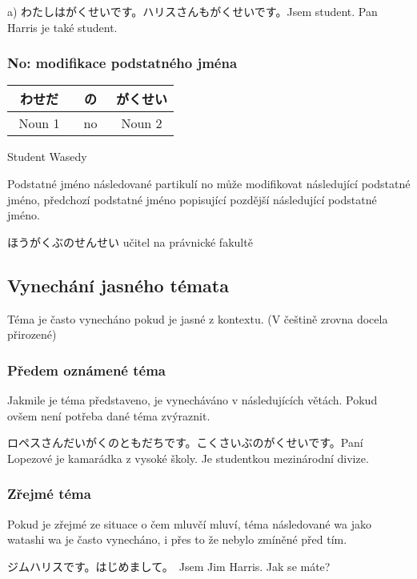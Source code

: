 a) わたしはがくせいです。ハリスさんもがくせいです。Jsem student. Pan Harris je také student.


\subsubsection{No: modifikace podstatného jména}
\begin{center}
\begin{tabular}{||c|c||c||}
\hline
わせだ　&の　&がくせい\\
\hline
Noun 1&no&Noun 2\\
\hline
\end{tabular}
\end{center}
Student Wasedy

Podstatné jméno následované partikulí no může modifikovat následující podstatné jméno, předchozí podstatné jméno popisující pozdější následující podstatné jméno. 


ほうがくぶのせんせい učitel na právnické fakultě

\subsection{Vynechání jasného témata}
Téma je často vynecháno pokud je jasné z kontextu. (V češtině zrovna docela přirozené)

\subsubsection{Předem oznámené téma}
Jakmile je téma představeno, je vynecháváno v následujících větách. Pokud ovšem není potřeba dané téma zvýraznit.

ロペスさんだいがくのともだちです。こくさいぶのがくせいです。Paní Lopezové je kamarádka z vysoké školy. Je studentkou mezinárodní divize.

\subsubsection{Zřejmé téma}

Pokud je zřejmé ze situace o čem mluvčí mluví, téma následované wa jako watashi wa je často vynecháno, i přes to že nebylo zmíněné před tím.


ジムハリスです。はじめまして。　Jsem Jim Harris. Jak se máte?




























